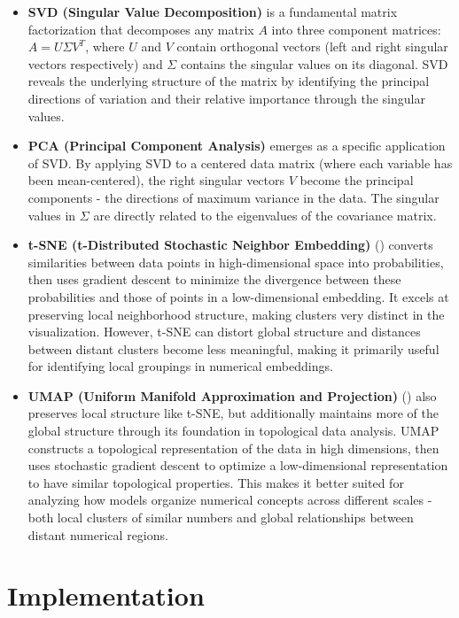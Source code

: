 \documentclass[
  a4paper, twoside, 10pt, titlepage]{book}
\begin{document}
\begin{itemize}
\item
  \textbf{SVD (Singular Value Decomposition)} is a fundamental matrix
  factorization that decomposes any matrix \(A\) into three component
  matrices: \(A = U\Sigma V^T\), where \(U\) and \(V\) contain
  orthogonal vectors (left and right singular vectors respectively) and
  \(\Sigma\) contains the singular values on its diagonal. SVD reveals
  the underlying structure of the matrix by identifying the principal
  directions of variation and their relative importance through the
  singular values.
\item
  \textbf{PCA (Principal Component Analysis)} emerges as a specific
  application of SVD. By applying SVD to a centered data matrix (where
  each variable has been mean-centered), the right singular vectors
  \(V\) become the principal components - the directions of maximum
  variance in the data. The singular values in \(\Sigma\) are directly
  related to the eigenvalues of the covariance matrix.
\item
  \textbf{t-SNE (t-Distributed Stochastic Neighbor Embedding)}
  () converts
  similarities between data points in high-dimensional space into
  probabilities, then uses gradient descent to minimize the divergence
  between these probabilities and those of points in a low-dimensional
  embedding. It excels at preserving local neighborhood structure,
  making clusters very distinct in the visualization. However, t-SNE can
  distort global structure and distances between distant clusters become
  less meaningful, making it primarily useful for identifying local
  groupings in numerical embeddings.
\item
  \textbf{UMAP (Uniform Manifold Approximation and Projection)}
  () also preserves
  local structure like t-SNE, but additionally maintains more of the
  global structure through its foundation in topological data analysis.
  UMAP constructs a topological representation of the data in high
  dimensions, then uses stochastic gradient descent to optimize a
  low-dimensional representation to have similar topological properties.
  This makes it better suited for analyzing how models organize
  numerical concepts across different scales - both local clusters of
  similar numbers and global relationships between distant numerical
  regions.
\end{itemize}

\chapter{Implementation}\label{implementation}
\end{document}
